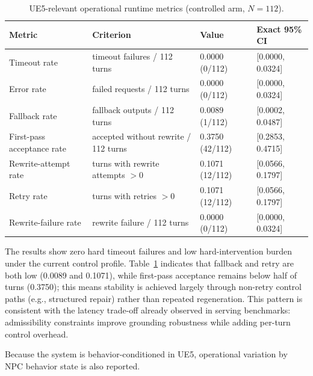 ﻿\documentclass[a4paper,12pt]{article}
\begin{document}
\begin{table}[t]
\centering
\caption{UE5-relevant operational runtime metrics (controlled arm, \(N=112\)).}
\label{tab:ue5_operational_metrics}
\begingroup
\footnotesize
\setlength{\tabcolsep}{4pt}
\begin{tabular}{p{}p{}p{}p{}}
\toprule
Metric & Criterion & Value & Exact 95\% CI \\
\midrule
Timeout rate & timeout failures / 112 turns & 0.0000 (0/112) & [0.0000, 0.0324] \\
Error rate & failed requests / 112 turns & 0.0000 (0/112) & [0.0000, 0.0324] \\
Fallback rate & fallback outputs / 112 turns & 0.0089 (1/112) & [0.0002, 0.0487] \\
First-pass acceptance rate & accepted without rewrite / 112 turns & 0.3750 (42/112) & [0.2853, 0.4715] \\
Rewrite-attempt rate & turns with rewrite attempts \(>0\) & 0.1071 (12/112) & [0.0566, 0.1797] \\
Retry rate & turns with retries \(>0\) & 0.1071 (12/112) & [0.0566, 0.1797] \\
Rewrite-failure rate & rewrite failure / 112 turns & 0.0000 (0/112) & [0.0000, 0.0324] \\
\bottomrule
\end{tabular}
\endgroup
\end{table}

The results show zero hard timeout failures and low hard-intervention burden under the current control profile. Table~\ref{tab:ue5_operational_metrics} indicates that fallback and retry are both low (0.0089 and 0.1071), while first-pass acceptance remains below half of turns (0.3750); this means stability is achieved largely through non-retry control paths (e.g., structured repair) rather than repeated regeneration. This pattern is consistent with the latency trade-off already observed in serving benchmarks: admissibility constraints improve grounding robustness while adding per-turn control overhead.

Because the system is behavior-conditioned in UE5, operational variation by NPC behavior state is also reported.
\end{document}
